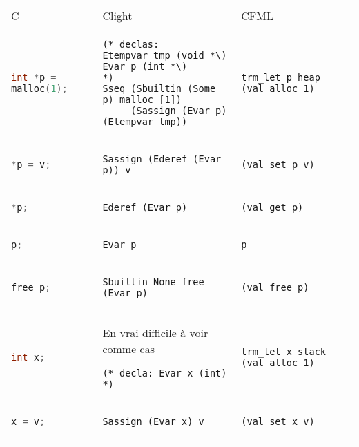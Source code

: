 \documentclass[class=scrartcl,border={0cm 1.5cm 1cm -0.5cm},multi={tabular}]{standalone}
\theoremstyle{break}
\newcommand{\clst}[1]{\lstinline[language=C]!#1!}
\begin{document}
\begin{tabular}{p{6cm}p{10cm}p{10cm}}
  \toprule
  C & Clight & CFML \\
  \clst{int *p = malloc(1);} &
\begin{lstlisting}
(* declas:
Etempvar tmp (void *\)
Evar p (int *\)
*)
Sseq (Sbuiltin (Some p) malloc [1])
     (Sassign (Evar p) (Etempvar tmp))
\end{lstlisting} &
\begin{lstlisting}
trm_let p heap (val_alloc 1)
\end{lstlisting} \\
  \clst{*p = v;}  &
\begin{lstlisting}
Sassign (Ederef (Evar p)) v
\end{lstlisting} &
\begin{lstlisting}
(val_set p v)
\end{lstlisting} \\
  \clst{*p;} &
\begin{lstlisting}
Ederef (Evar p)
\end{lstlisting} &
\begin{lstlisting}
(val_get p)
\end{lstlisting} \\
\clst{p;} &
\begin{lstlisting}
Evar p
\end{lstlisting} &
\begin{lstlisting}
p
\end{lstlisting} \\
  \clst{free p;} &
\begin{lstlisting}
Sbuiltin None free (Evar p)
\end{lstlisting} &
\begin{lstlisting}
(val_free p)
\end{lstlisting} \\
  \midrule
  \clst{int x;} &
En vrai difficile à voir comme cas
\begin{lstlisting}
(* decla: Evar x (int) *)
\end{lstlisting} &
\begin{lstlisting}
trm_let x stack (val_alloc 1)
\end{lstlisting} \\
  \clst{x = v;} &
\begin{lstlisting}
Sassign (Evar x) v
\end{lstlisting} &
\begin{lstlisting}
(val_set x v)
\end{lstlisting} \\

\end{tabular}
\end{document}
